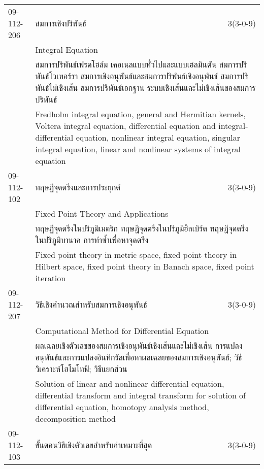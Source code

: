 \begin{longtable}{p{}p{}r{}}
09-112-206 & สมการเชิงปริพันธ์ & 3(3-0-9)\\*
 & Integral Equation & \phantom{x} \vspace{3mm} \\*
&  \multicolumn{2}{p{0.75\textwidth}}{สมการปริพันธ์เฟรดโฮล์ม เคอเนลแบบทั่วไปและแบบเฮลมินตัน สมการปริพันธ์โวเทอร์รา สมการเชิงอนุพันธ์และสมการปริพันธ์เชิงอนุพันธ์ สมการปริพันธ์ไม่เชิงเส้น สมการปริพันธ์เอกฐาน ระบบเชิงเส้นและไม่เชิงเส้นของสมการปริพันธ์} \vspace{3mm} \\*
&  \multicolumn{2}{p{0.75\textwidth}}{Fredholm integral equation, general and Hermitian kernels, Voltera integral equation, differential equation and integral-differential equation, nonlinear integral equation, singular integral equation, linear and nonlinear systems of integral equation} \vspace{8mm} \\*
09-112-102 & ทฤษฎีจุดตรึงและการประยุกต์ & 3(3-0-9)\\*
 & Fixed Point Theory and Applications & \phantom{x} \vspace{3mm} \\*
&  \multicolumn{2}{p{0.75\textwidth}}{ทฤษฎีจุดตรึงในปริภูมิเมตริก ทฤษฎีจุดตรึงในปริภูมิฮิลเบิร์ต ทฤษฎีจุดตรึงในปริภูมิบานาค การทำซ้ำเพื่อหาจุดตรึง} \vspace{3mm} \\*
&  \multicolumn{2}{p{0.75\textwidth}}{Fixed point theory in metric space, fixed point theory in Hilbert space, fixed point theory in Banach space, fixed point iteration} \vspace{8mm} \\*
09-112-207 & วิธีเชิงคำนวณสำหรับสมการเชิงอนุพันธ์ & 3(3-0-9)\\*
 & Computational Method for Differential Equation & \phantom{x} \vspace{3mm} \\*
&  \multicolumn{2}{p{0.75\textwidth}}{ผลเฉลยเชิงตัวเลขของสมการเชิงอนุพันธ์เชิงเส้นและไม่เชิงเส้น การแปลงอนุพันธ์และการแปลงอินทิกรัลเพื่อหาผลเฉลยของสมการเชิงอนุพันธ์; วิธีวิเคราะห์โฮโมโทฟี; วิธีแยกส่วน} \vspace{3mm} \\*
&  \multicolumn{2}{p{0.75\textwidth}}{Solution of linear and nonlinear differential equation, differential transform and integral transform for solution of differential equation, homotopy analysis method, decomposition method} \vspace{8mm} \\*
09-112-103 & ขั้นตอนวิธีเชิงตัวเลขสำหรับค่าเหมาะที่สุด & 3(3-0-9)\\*

\end{longtable}
